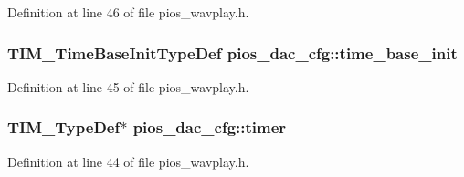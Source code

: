 \-Definition at line 46 of file pios\-\_\-wavplay.\-h.

\hypertarget{group___p_i_o_s___w_a_v_p_l_a_y_ga1568b0926bb1e178d06682a8495e0f40}{
\subsubsection[{time\-\_\-base\-\_\-init}]{\setlength{\rightskip}{0pt plus 5cm}\-T\-I\-M\-\_\-\-Time\-Base\-Init\-Type\-Def {\bf pios\-\_\-dac\-\_\-cfg\-::time\-\_\-base\-\_\-init}}}\label{group___p_i_o_s___w_a_v_p_l_a_y_ga1568b0926bb1e178d06682a8495e0f40}


\-Definition at line 45 of file pios\-\_\-wavplay.\-h.

\hypertarget{group___p_i_o_s___w_a_v_p_l_a_y_ga06b2a838489fd6bb8f48615002e024d8}{
\subsubsection[{timer}]{\setlength{\rightskip}{0pt plus 5cm}\-T\-I\-M\-\_\-\-Type\-Def$\ast$ {\bf pios\-\_\-dac\-\_\-cfg\-::timer}}}\label{group___p_i_o_s___w_a_v_p_l_a_y_ga06b2a838489fd6bb8f48615002e024d8}


\-Definition at line 44 of file pios\-\_\-wavplay.\-h.

